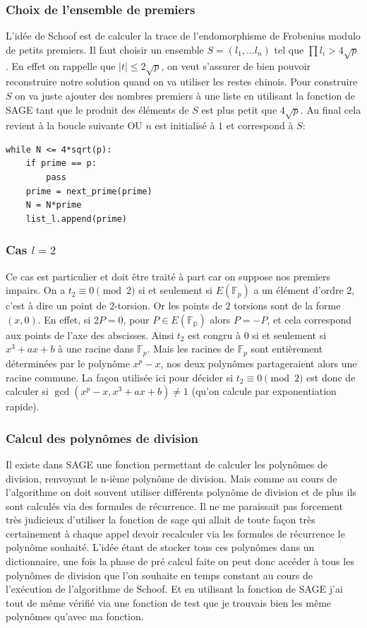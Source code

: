 \documentclass{article}
\begin{document}
\subsubsection{Choix de l'ensemble de premiers}
L'idée de Schoof est de calculer la trace de l'endomorphisme de Frobenius modulo de petits premiers. Il faut choisir un ensemble $S = (l_1, \ldots l_n)$ tel que $\prod l_i > 4\sqrt{p}$. En effet on rappelle que  $|t| \leq 2 \sqrt{p}$, on veut s'assurer de bien pouvoir reconstruire notre solution quand on va utiliser les restes chinois. Pour construire $S$ on va juste ajouter des nombres premiers à une liste en utilisant la fonction  de SAGE tant que le produit des éléments de $S$ est plus petit que $ 4\sqrt{p}$. Au final cela revient à la boucle suivante OU $n$ est initialisé à $1$ et  correspond à $S$:
\bigskip

\begin{lstlisting}
while N <= 4*sqrt(p):
	if prime == p:
		pass
	prime = next_prime(prime)
	N = N*prime
	list_l.append(prime)
\end{lstlisting}


\subsubsection{Cas $l=2$}
Ce cas est particulier et doit être traité à part car on suppose nos premiers impairs. On a $t_2 \equiv 0 \pmod 2$ si et seulement si $E(\mathbb{F}_p)$ a un élément d'ordre $2$, c'est à dire un point de $2$-torsion. Or les points de $2$ torsions sont de la forme $(x, 0)$. En effet, si $2P = 0$, pour $P \in E(\mathbb{F_p})$ alors $P = -P$, et cela correspond aux points de l'axe des abscisses. Ainsi $t_2$ est congru à $0$ si et seulement si $x^3 +ax +b$ à une racine dans $\mathbb{F}_p$. Mais les racines de $\mathbb{F}_p$ sont entièrement déterminées par le polynôme $x^p - x$, nos deux polynômes partageraient alors une racine commune. La façon utilisée ici pour décider si $t_2 \equiv 0 \pmod 2$ est donc de calculer si $\gcd(x^p - x, x^3 +ax +b) \ne 1$ (qu'on calcule par exponentiation rapide).

\subsubsection{Calcul des polynômes de division}
Il existe dans SAGE une fonction permettant de calculer les polynômes de division,  renvoyant le n-ième polynôme de division. Mais comme au cours de l'algorithme on doit souvent utiliser différents polynôme de division et de plus ils sont calculés via des formules de récurrence. Il ne me paraissait pas forcement très judicieux d'utiliser la fonction de sage qui allait de toute façon très certainement à chaque appel devoir recalculer via les formules de récurrence le polynôme souhaité. L'idée étant de stocker tous ces polynômes dans un dictionnaire, une fois la phase de pré calcul faite on peut donc accéder à tous les polynômes de division que l'on souhaite en temps constant au cours de l'exécution de l'algorithme de Schoof. Et en utilisant la fonction de SAGE j'ai tout de même vérifié via une fonction de test que je trouvais bien les même polynômes qu'avec ma fonction.
\end{document}
